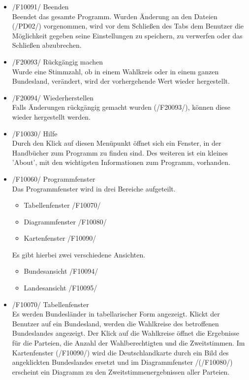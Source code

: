 \documentclass[10pt,a4paper]{article}
\begin{document}
\begin{itemize}
	\item /F10091/ Beenden \hfill \\
	Beendet das gesamte Programm. Wurden Änderung an den Dateien (/PD02/) vorgenommen, wird vor dem Schließen des Tabs dem Benutzer die Möglichkeit gegeben seine Einstellungen zu speichern, zu verwerfen 
	oder das Schließen abzubrechen.
	\item /F20093/ Rückgängig machen \hfill \\
	Wurde eine Stimmzahl, ob in einem Wahlkreis oder in einem ganzen Bundesland, verändert, wird der vorhergehende Wert wieder hergestellt.
	\item /F20094/ Wiederherstellen \hfill \\
	Falls Änderungen rückgängig gemacht wurden (/F20093/), können diese wieder hergestellt werden.
	\item /F10030/ Hilfe \hfill \\
	Durch den Klick auf diesen Menüpunkt öffnet sich ein Fenster, in der Handbücher zum Programm zu finden sind. Des weiteren ist ein kleines 'About', mit den wichtigsten Informationen zum Programm, vorhanden.
	\item /F10060/ Programmfenster \hfill \\
	Das Programmfenster wird in drei Bereiche aufgeteilt.
	\begin{itemize}
		\item Tabellenfenster /F10070/
		\item Diagrammfenster /F10080/
		\item Kartenfenster /F10090/
	\end{itemize}
	Es gibt hierbei zwei verschiedene Ansichten.
	\begin{itemize}
		\item Bundesansicht /F10094/
		\item Landesansicht /F10095/
	\end{itemize}
	\item /F10070/ Tabellenfenster \hfill \\
	Es werden Bundesländer in tabellarischer Form angezeigt. Klickt der Benutzer auf ein Bundesland, werden die Wahlkreise des betroffenen Bundeslandes angezeigt. Der Klick auf die Wahlkreise öffnet die Ergebnisse für die Parteien, die Anzahl der Wahlberechtigten und die Zweitstimmen. Im Kartenfenster (/F10090/) wird die Deutschlandkarte durch ein Bild des angeklickten Bundeslandes ersetzt und im Diagrammfenster /(/F10080/) erscheint ein Diagramm zu den Zweitstimmenergebnissen aller Parteien. \\

\end{itemize}
\end{document}
